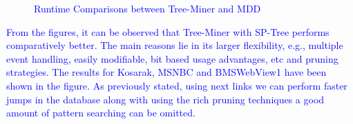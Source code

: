 \begin{figure*}[!tb]
\begin{subfigure}{.3\linewidth}
\begin{adjustbox}{max width=\textwidth}
        \end{adjustbox}
        \caption{}
        \end{subfigure}
        \begin{subfigure}{.3\linewidth}
          \centering
        \begin{adjustbox}{max width=\textwidth}
        \end{adjustbox}
        \caption{}
        \end{subfigure}
        \caption{\textcolor{blue}{Runtime Comparisons between Tree-Miner and MDD}}
        \label{graph:runtime_comparison_with_mdd}
        \end{figure*}

\textcolor{blue}{From the figures, it can be observed that Tree-Miner with SP-Tree performs comparatively better. The main reasons lie in its larger flexibility, e.g., multiple event handling, easily modifiable, bit based usage advantages, etc and pruning strategies. The results for Kosarak, MSNBC and BMSWebView1 have been shown in the figure. As previously stated, using next links we can perform faster jumps in the database along with using the rich pruning techniques a good amount of pattern searching can be omitted.}  


